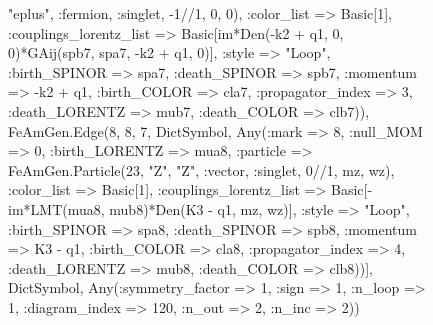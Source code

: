 \documentclass{revtex4}
\begin{document}
\begin{figure}[!htb]
\begin{center}
{"eplus", :fermion, :singlet, -1//1, 0, 0), :color_list => Basic[1], :couplings_lorentz_list => Basic[im*Den(-k2 + q1, 0, 0)*GAij(spb7, spa7, -k2 + q1, 0)], :style => "Loop", :birth_SPINOR => spa7, :death_SPINOR => spb7, :momentum => -k2 + q1, :birth_COLOR => cla7, :propagator_index => 3, :death_LORENTZ => mub7, :death_COLOR => clb7)), FeAmGen.Edge(8, 8, 7, Dict{Symbol, Any}(:mark => 8, :null_MOM => 0, :birth_LORENTZ => mua8, :particle => FeAmGen.Particle(23, "Z", "Z", :vector, :singlet, 0//1, mz, wz), :color_list => Basic[1], :couplings_lorentz_list => Basic[-im*LMT(mua8, mub8)*Den(K3 - q1, mz, wz)], :style => "Loop", :birth_SPINOR => spa8, :death_SPINOR => spb8, :momentum => K3 - q1, :birth_COLOR => cla8, :propagator_index => 4, :death_LORENTZ => mub8, :death_COLOR => clb8))], Dict{Symbol, Any}(:symmetry_factor => 1, :sign => 1, :n_loop => 1, :diagram_index => 120, :n_out => 2, :n_inc => 2)) 
}
\end{center}
\end{figure}
\end{document}
